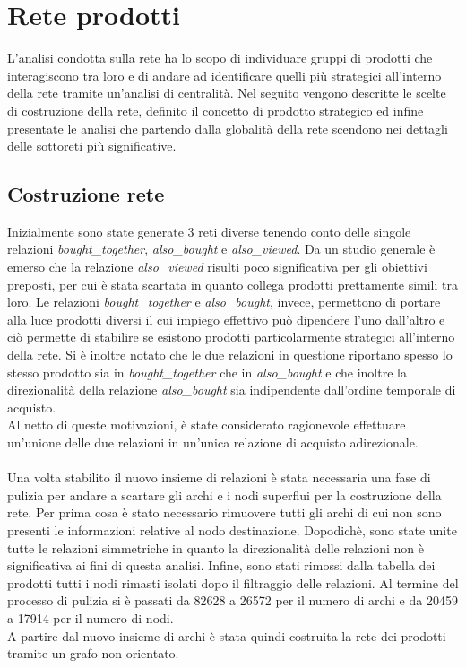 \section{Rete prodotti}\label{ReteProdotti}
L'analisi condotta sulla rete ha lo scopo di individuare gruppi di prodotti che interagiscono tra loro e di andare ad identificare quelli più strategici all'interno della rete tramite un'analisi di centralità. Nel seguito vengono descritte le scelte di costruzione della rete, definito il concetto di prodotto strategico ed infine presentate le analisi che partendo dalla globalità della rete scendono nei dettagli delle sottoreti più significative. 

\subsection{Costruzione rete}
Inizialmente sono state generate 3 reti diverse tenendo conto delle singole relazioni \textit{bought\_together}, \textit{also\_bought} e \textit{also\_viewed}. Da un studio generale è emerso che la relazione \textit{also\_viewed} risulti poco significativa per gli obiettivi preposti, per cui è stata scartata in quanto collega prodotti prettamente simili tra loro. Le relazioni \textit{bought\_together} e \textit{also\_bought}, invece, permettono di portare alla luce prodotti diversi il cui impiego effettivo può dipendere l'uno dall'altro e ciò permette di stabilire se esistono prodotti particolarmente strategici all'interno della rete. Si è inoltre notato che le due relazioni in questione riportano spesso lo stesso prodotto sia in \textit{bought\_together} che in \textit{also\_bought} e che inoltre la direzionalità della relazione \textit{also\_bought} sia indipendente dall'ordine temporale di acquisto. \\
Al netto di queste motivazioni, è state considerato ragionevole effettuare un'unione delle due relazioni in un'unica relazione di acquisto adirezionale. 
\\\\
Una volta stabilito il nuovo insieme di relazioni è stata necessaria una fase di pulizia per andare a scartare gli archi e i nodi superflui per la costruzione della rete. Per prima cosa è stato necessario rimuovere tutti gli archi di cui non sono presenti le informazioni relative al nodo destinazione. Dopodichè, sono state unite tutte le relazioni simmetriche in quanto la direzionalità delle relazioni non è significativa ai fini di questa analisi. Infine, sono stati rimossi dalla tabella dei prodotti tutti i nodi rimasti isolati dopo il filtraggio delle relazioni. Al termine del processo di pulizia si è passati da 82628 a 26572 per il numero di archi e da 20459 a 17914 per il numero di nodi. \\
A partire dal nuovo insieme di archi è stata quindi costruita la rete dei prodotti tramite un grafo non orientato.



